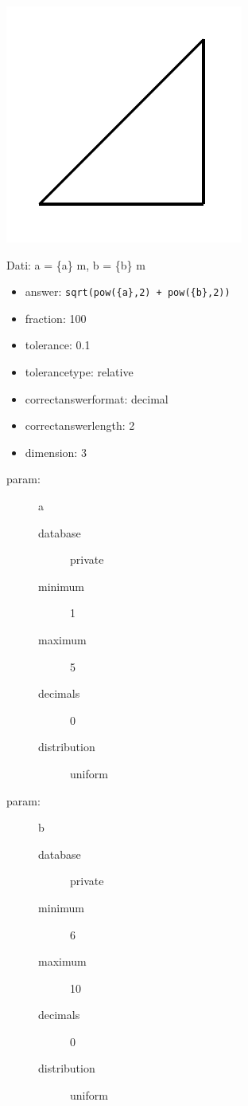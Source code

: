 \documentclass{article}
\begin{document}
\includegraphics[width=0.3\columnwidth]{./img/triangle}

Dati: a = \{a\} m, b = \{b\} m

\begin{itemize}
	\item answer: \texttt{sqrt(pow(\{a\},2) + pow(\{b\},2))}
	\item fraction: 100
	\item tolerance: 0.1
	\item tolerancetype: relative %
	\item correctanswerformat: decimal %
	\item correctanswerlength: 2
	\item dimension: 3
\end{itemize}

\begin{description}
	\item[param:] a
	\begin{description}
		\item[database] private  %
		\item[minimum] 1
		\item[maximum] 5
		\item[decimals] 0
		\item[distribution] uniform   %
	\end{description}
	\item[param:] b
	\begin{description}
		\item[database] private  %
		\item[minimum] 6
		\item[maximum] 10
		\item[decimals] 0
		\item[distribution] uniform   %
    \end{description}
\end{description}
\end{document}
